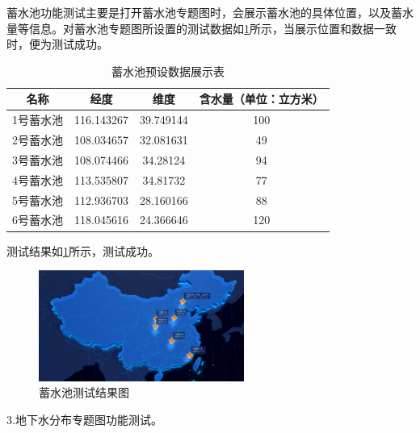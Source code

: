 蓄水池功能测试主要是打开蓄水池专题图时，会展示蓄水池的具体位置，以及蓄水量等信息。对蓄水池专题图所设置的测试数据如\ref{xushuici}所示，当展示位置和数据一致时，便为测试成功。
\begin{table}[H]
	\centering
	\caption[蓄水池数据]{蓄水池预设数据展示表}
	\label{xushuici}
	\begin{tabular}{cccc}
		\toprule
		名称           &经度 & 维度   & 含水量（单位：立方米）    \\
		\midrule
		1号蓄水池         & 116.143267&39.749144&100  \\
		2号蓄水池     & 108.034657  &32.081631 &49  \\
		3号蓄水池     & 108.074466 &34.28124&  94    \\
		4号蓄水池      & 113.535807 &34.81732&77    \\
		5号蓄水池   & 112.936703 &28.160166&88      \\
		6号蓄水池 & 118.045616 &24.366646&120      \\

		\bottomrule
	\end{tabular}
\end{table}

测试结果如\ref{fig:ceshixushuici}所示，测试成功。
\begin{figure}[!htb]%
	\centering
	\includegraphics[width=0.60\textwidth]{figs/测试蓄水池.png}
	\caption{蓄水池测试结果图}
	\label{fig:ceshixushuici}
\end{figure}

3.地下水分布专题图功能测试。

